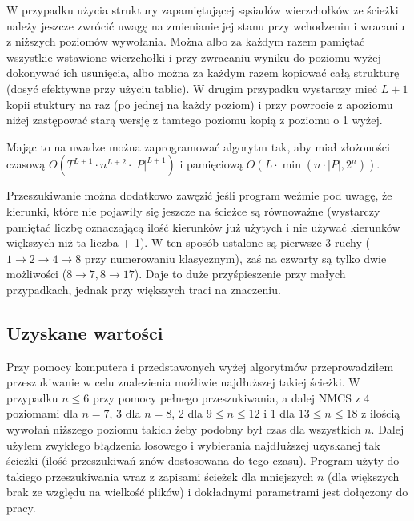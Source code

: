 \documentclass{pracamgr}
\begin{document}
     W przypadku użycia struktury zapamiętującej sąsiadów wierzchołków ze ścieżki należy jeszcze zwrócić uwagę na zmienianie jej stanu przy wchodzeniu
     i wracaniu z niższych poziomów wywołania. Można albo za każdym razem pamiętać wszystkie wstawione wierzchołki i przy zwracaniu wyniku
     do poziomu wyżej dokonywać ich usunięcia, albo można za każdym razem kopiować całą strukturę (dosyć efektywne przy użyciu tablic).
     W drugim przypadku wystarczy mieć $L+1$ kopii stuktury na raz (po jednej na każdy poziom) i przy powrocie z apoziomu niżej
     zastępować starą wersję z tamtego poziomu kopią z poziomu o 1 wyżej.
     
     Mając to na uwadze można zaprogramować algorytm tak, aby miał złożoności czasową $O(T^{L+1}\cdot n^{L+2}\cdot|P|^{L+1})$
     i pamięciową $O(L\cdot \min(n\cdot |P|,2^n))$.\newline
     
     Przeszukiwanie można dodatkowo zawęzić jeśli program weźmie pod uwagę, że kierunki, które nie pojawiły się jeszcze na ścieżce są równoważne
     (wystarczy pamiętać liczbę oznaczającą ilość kierunków już użytych i nie używać kierunków większych niż ta liczba + 1).
     W ten sposób ustalone są pierwsze 3 ruchy ($1\rightarrow2\rightarrow4\rightarrow8$ przy numerowaniu klasycznym),
     zaś na czwarty są tylko dwie możliwości ($8\rightarrow7,8\rightarrow17$). Daje to duże przyśpieszenie przy małych przypadkach,
     jednak przy większych traci na znaczeniu.
    \subsection{Uzyskane wartości}
     Przy pomocy komputera i przedstawonych wyżej algorytmów przeprowadziłem przeszukiwanie w celu znalezienia możliwie najdłuższej takiej ścieżki.
     W przypadku $n\le6$ przy pomocy pełnego przeszukiwania, a dalej NMCS z 4 poziomami dla $n=7$, 3 dla $n=8$, 2 dla $9\le n\le12$ i 1 dla $13\le n\le18$
     z ilością wywołań niższego poziomu takich żeby podobny był czas dla wszystkich $n$. Dalej użyłem zwykłego błądzenia losowego i wybierania najdłuższej
     uzyskanej tak ścieżki (ilość przeszukiwań znów dostosowana do tego czasu).
     Program użyty do takiego przeszukiwania wraz z zapisami ścieżek dla mniejszych $n$ (dla większych brak ze względu na wielkość plików)
     i dokładnymi parametrami jest dołączony do pracy.\newline
     
\end{document}
